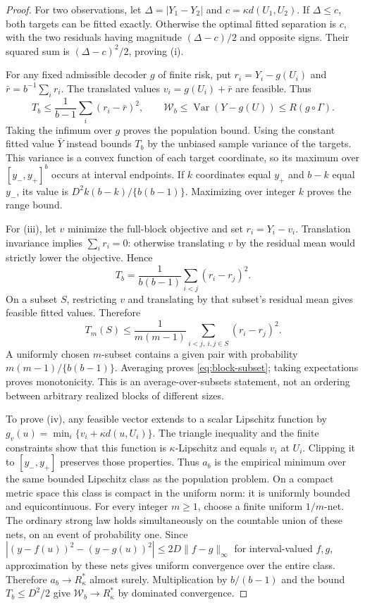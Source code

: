 \begin{proof}
For two observations, let
$\Delta=|Y_1-Y_2|$ and $c=\kappa d(U_1,U_2)$. If $\Delta\leq c$,
both targets can be fitted exactly. Otherwise the optimal fitted
separation is $c$, with the two residuals having magnitude
$(\Delta-c)/2$ and opposite signs. Their squared sum is
$(\Delta-c)^2/2$, proving (i).

For any fixed admissible decoder $g$ of finite risk, put
$r_i=Y_i-g(U_i)$ and $\bar r=b^{-1}\sum_i r_i$.
The translated values $v_i=g(U_i)+\bar r$ are feasible. Thus
\[
 T_b\leq\frac1{b-1}\sum_i(r_i-\bar r)^2,
 \qquad
 \mathcal{W}_b\leq\operatorname{Var}(Y-g(U))\leq R(g\circ\Gamma).
\]
Taking the infimum over $g$ proves the population bound. Using the
constant fitted value $\bar Y$ instead bounds $T_b$ by the unbiased
sample variance of the targets. This variance is a convex function
of each target coordinate, so its maximum over $[y_-,y_+]^b$ occurs
at interval endpoints. If $k$ coordinates equal $y_+$ and $b-k$
equal $y_-$, its value is $D^2 k(b-k)/\{b(b-1)\}$. Maximizing over
integer $k$ proves the range bound.

For (iii), let $v$ minimize the full-block objective and set
$r_i=Y_i-v_i$. Translation invariance implies $\sum_i r_i=0$:
otherwise translating $v$ by the residual mean would strictly lower
the objective. Hence
\begin{equation}
 T_b=\frac1{b(b-1)}\sum_{i<j}(r_i-r_j)^2.
 \label{eq:block-residual-identity}
\end{equation}
On a subset $S$, restricting $v$ and translating by that subset's
residual mean gives feasible fitted values. Therefore
\[
 T_m(S)\leq\frac1{m(m-1)}
                  \sum_{i<j,\ i,j\in S}(r_i-r_j)^2.
\]
A uniformly chosen $m$-subset contains a given pair with probability
$m(m-1)/\{b(b-1)\}$. Averaging proves
\eqref{eq:block-subset}; taking expectations proves monotonicity.
This is an average-over-subsets statement, not an ordering between
arbitrary realized blocks of different sizes.

To prove (iv), any feasible vector extends to a scalar Lipschitz
function by
$g_v(u)=\min_i\{v_i+\kappa d(u,U_i)\}$.
The triangle inequality and the finite constraints show that this
function is $\kappa$-Lipschitz and equals $v_i$ at $U_i$.
Clipping it to $[y_-,y_+]$ preserves those properties. Thus $a_b$
is the empirical minimum over the same bounded Lipschitz class as
the population problem. On a compact metric space this class is
compact in the uniform norm: it is uniformly bounded and
equicontinuous. For every integer $m\geq1$, choose a finite uniform
$1/m$-net. The ordinary strong law holds simultaneously on the countable
union of these nets, on an event of probability one. Since
$|(y-f(u))^2-(y-g(u))^2|\leq2D\|f-g\|_\infty$ for interval-valued
$f,g$, approximation by these nets gives uniform convergence over the entire
class. Therefore
$a_b\to R^*_\kappa$ almost surely. Multiplication by $b/(b-1)$
and the bound $T_b\leq D^2/2$ give $\mathcal{W}_b\to R^*_\kappa$ by
dominated convergence.
\end{proof}

